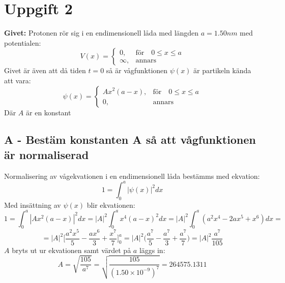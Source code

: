 \documentclass{article}
\begin{document}
  \newpage
  \section*{Uppgift 2}
      \textbf{Givet:} Protonen rör sig i en endimensionell låda med längden $a=1.50nm$ med potentialen:
      \[
        V(x)=
        \begin{cases}
          0,      & \text{för}\quad0\leq x\leq a\\
          \infty, & \text{annars}
        \end{cases}
      \]
      Givet är även att då tiden $t=0$ så är vågfunktionen $\psi(x)$ är partikeln kända att vara:
      \[
        \psi(x)=
        \begin{cases}
          Ax^2(a-x),& \text{för}\quad0\leq x\leq a\\
          0,        & \text{annars}
        \end{cases}
      \]
      Där $A$ är en konstant
      \subsection*{A - Bestäm konstanten A så att vågfunktionen är normaliserad}
        Normalisering av vågekvationen i en endimensionell låda bestämms med ekvation:
        \[
          1=\int_{0}^{a}|\psi(x)|^2dx
        \]
        Med insättning av $\psi(x)$ blir ekvationen:
        \[
          1=\int_{0}^{a}|Ax^2(a-x)|^2dx=|A|^2\int_0^ax^4(a-x)^2dx=|A|^2\int_0^a(a^2x^4-2ax^5+x^6)dx=
        \]
        \[
          =|A|^2\bigg[\frac{a^2x^5}{5}-\frac{ax^6}{3}+\frac{x^7}{7}\bigg]_0^a=|A|^2\bigg(\frac{a^7}{5}-\frac{a^7}{3}+\frac{a^7}{7}\bigg)=|A|^2\frac{a^7}{105}
        \]
        $A$ bryts ut ur ekvationen samt värdet på $a$ läggs in:
        \[
          A=\sqrt{\frac{105}{a^7}}=\sqrt{\frac{105}{(1.50\times10^{-9})^7}}=\mathbf{264575.1311}
        \]
\end{document}
